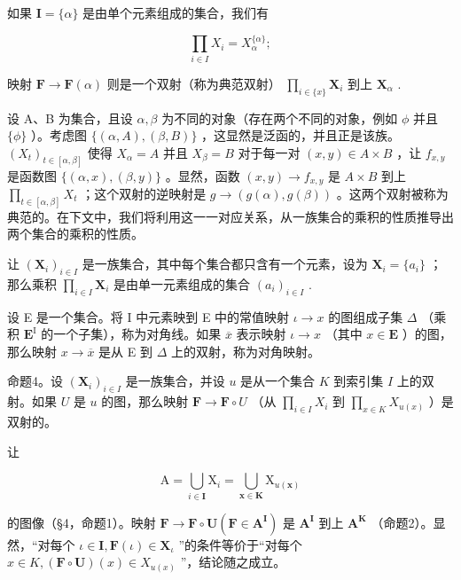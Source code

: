 如果 \(\mathbf{I} = \{\alpha\}\) 是由单个元素组成的集合，我们有

\[
\prod_ {i \in I} X _ {i} = X _ {\alpha} ^ {\{\alpha \}};
\]

映射 \(\mathbf{F} \to \mathbf{F}(\alpha)\) 则是一个双射（称为典范双射） \(\prod_{i \in \{x\}} \mathbf{X}_i\) 到上 \(\mathbf{X}_\alpha\) .

设 A、B 为集合，且设 \(\alpha, \beta\) 为不同的对象（存在两个不同的对象，例如 \(\phi\) 并且 \(\{\phi\}\) ）。考虑图 \(\{(\alpha, A), (\beta, B)\}\) ，这显然是泛函的，并且正是该族。 \((X_{t})_{t \in [\alpha, \beta]}\) 使得 \(X_{\alpha} = A\) 并且 \(X_{\beta} = B\) 对于每一对 \((x, y) \in A \times B\) ，让 \(f_{x,y}\) 是函数图 \(\{(\alpha, x), (\beta, y)\}\) 。显然，函数 \((x, y) \to f_{x,y}\) 是 \(A \times B\) 到上 \(\prod_{t \in [\alpha, \beta]} X_t\) ；这个双射的逆映射是 \(g \to (g(\alpha), g(\beta))\) 。这两个双射被称为典范的。在下文中，我们将利用这一一对应关系，从一族集合的乘积的性质推导出两个集合的乘积的性质。

让 \((\mathbf{X}_i)_{i\in I}\) 是一族集合，其中每个集合都只含有一个元素，设为 \(\mathbf{X}_i = \{a_i\}\) ；那么乘积 \(\prod_{i\in I}\mathbf{X}_i\) 是由单一元素组成的集合 \((a_i)_{i\in I}\) .

设 E 是一个集合。将 I 中元素映到 E 中的常值映射 \(\iota \to x\) 的图组成子集 \(\Delta\) （乘积 \(\mathbf{E}^{\mathrm{I}}\) 的一个子集），称为对角线。如果 \(\overline{x}\) 表示映射 \(\iota \to x\) （其中 \(x \in \mathbf{E}\) ）的图，那么映射 \(x \to \overline{x}\) 是从 E 到 \(\Delta\) 上的双射，称为对角映射。

命题4。设 \((\mathbf{X}_i)_{i\in I}\) 是一族集合，并设 \(u\) 是从一个集合 \(K\) 到索引集 \(I\) 上的双射。如果 \(U\) 是 \(u\) 的图，那么映射 \(\mathbf{F} \to \mathbf{F} \circ U\) （从 \(\prod_{i\in I} X_i\) 到 \(\prod_{x\in K} X_{u(x)}\) ）是双射的。

让

\[
\mathrm{A} = \bigcup_ {i \in \mathbf {I}} \mathrm{X} _ {i} = \bigcup_ {\boldsymbol {x} \in \mathbf {K}} \mathrm{X} _ {u (\boldsymbol {x})}
\]

的图像（§4，命题1）。映射 \(\mathbf{F} \to \mathbf{F} \circ \mathbf{U} (\mathbf{F} \in \mathbf{A}^{\mathbf{I}})\) 是 \(\mathbf{A}^{\mathbf{I}}\) 到上 \(\mathbf{A}^{\mathbf{K}}\) （命题2）。显然，“对每个 \(\iota \in \mathbf{I}, \mathbf{F}(\iota) \in \mathbf{X}_{\iota}\) ”的条件等价于“对每个 \(x \in K, (\mathbf{F} \circ \mathbf{U})(x) \in X_{u(x)}\) ”，结论随之成立。

